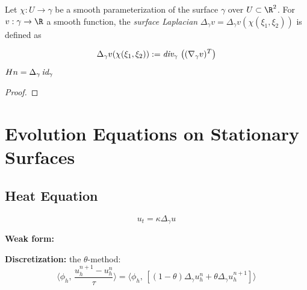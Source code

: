 \documentclass[10pt]{article}
\begin{document}
\begin{definition}
   
\end{definition}

\begin{definition} Let $\chi : U \to \gamma$ be
   a smooth parameterization of the surface $\gamma$ over $U \subset \R^2$. For
   $v : \gamma \to \R$  a smooth function, the 
   \emph{surface Laplacian} $\Delta_{\gamma} v = \Delta_\gamma v(\chi(\xi_1,\xi_2))$ is defined as 

   \begin{equation}
      \Delta_\gamma v(\chi(\xi_1,\xi_2)) := \emph{div}_{\gamma}\, \left( (\nabla_\gamma
      v)^T \right)
      \label{eqn:surface_laplacian}
   \end{equation}
   
\end{definition}


\begin{theorem}{ $Hn = \Delta_{\gamma}\, \emph{id}_\gamma$ }
   \label{thm:vector_mean_curvature}
\end{theorem}

\begin{proof}
\end{proof}




\section{Evolution Equations on Stationary Surfaces}


\subsection{Heat Equation}

\begin{equation}
   u_t = \kappa \Delta_{\gamma} u
   \label{eqn:heat}
\end{equation}

{\bf Weak form:} 

{\bf Discretization:} the $\theta$-method: 
\begin{equation}
   \langle \phi_h, \, \frac{u_h^{n+1} - u_h^n}{\tau} \rangle = \langle \phi_h,
   \, \left[ (1 - \theta)\Delta_\gamma u_h^{n} + \theta
   \Delta_{\gamma} u_h^{n+1}\right]\rangle
   \label{disc:heat_theta}
\end{equation}
\end{document}
